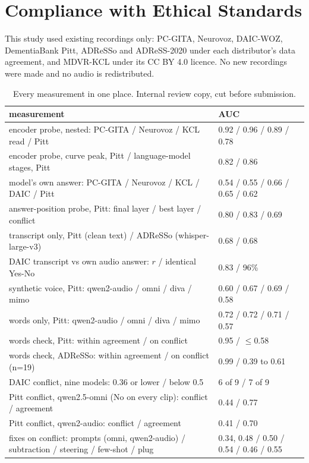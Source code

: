 \documentclass[conference]{IEEEtran}
\begin{document}
\section*{Compliance with Ethical Standards}
This study used existing recordings only: PC-GITA, Neurovoz, DAIC-WOZ, DementiaBank Pitt, ADReSSo and
ADReSS-2020 under each distributor's data agreement, and MDVR-KCL under its CC BY 4.0 licence. No new
recordings were made and no audio is redistributed.





\clearpage
\begin{table}[!t]
\centering\small
\caption{Every measurement in one place. Internal review copy, cut before submission.}
\begin{tabular}{@{}p{}p{}@{}}
\toprule
measurement & AUC \\
\midrule
encoder probe, nested: PC-GITA / Neurovoz / KCL read / Pitt & 0.92 / 0.96 / 0.89 / 0.78 \\
encoder probe, curve peak, Pitt / language-model stages, Pitt & 0.82 / 0.86 \\
model's own answer: PC-GITA / Neurovoz / KCL / DAIC / Pitt & 0.54 / 0.55 / 0.66 / 0.65 / 0.62 \\
answer-position probe, Pitt: final layer / best layer / conflict & 0.80 / 0.83 / 0.69 \\
transcript only, Pitt (clean text) / ADReSSo (whisper-large-v3) & 0.68 / 0.68 \\
DAIC transcript vs own audio answer: $r$ / identical Yes-No & 0.83 / 96\% \\
synthetic voice, Pitt: qwen2-audio / omni / diva / mimo & 0.60 / 0.67 / 0.69 / 0.58 \\
words only, Pitt: qwen2-audio / omni / diva / mimo & 0.72 / 0.72 / 0.71 / 0.57 \\
words check, Pitt: within agreement / on conflict & 0.95 / $\le$0.58 \\
words check, ADReSSo: within agreement / on conflict (n=19) & 0.99 / 0.39 to 0.61 \\
DAIC conflict, nine models: 0.36 or lower / below 0.5 & 6 of 9 / 7 of 9 \\
Pitt conflict, qwen2.5-omni (No on every clip): conflict / agreement & 0.44 / 0.77 \\
Pitt conflict, qwen2-audio: conflict / agreement & 0.41 / 0.70 \\
fixes on conflict: prompts (omni, qwen2-audio) / subtraction / steering / few-shot / plug & 0.34, 0.48 / 0.50 / 0.54 / 0.46 / 0.55 \\

\end{tabular}
\end{table}
\end{document}
